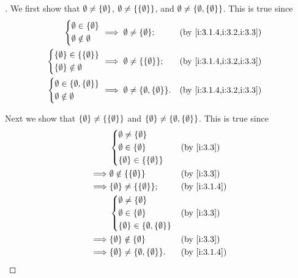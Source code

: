 \begin{proof}[]
  We first show that \(\emptyset \neq \left\lbrace\emptyset\right\rbrace\), \(\emptyset \neq \left\lbrace\left\lbrace\emptyset\right\rbrace\right\rbrace\), and \(\emptyset \neq \left\lbrace\emptyset, \left\lbrace\emptyset\right\rbrace\right\rbrace\).
  This is true since
  \begin{align*}
    \begin{dcases}
      \emptyset \in \set{\emptyset} \\
      \emptyset \notin \emptyset
    \end{dcases}                          & \implies \emptyset \neq \set{\emptyset};                  &  & \by{i:3.1.4,i:3.2,i:3.3} \\
    \begin{dcases}
      \set{\emptyset} \in \set{\set{\emptyset}} \\
      \set{\emptyset} \notin \emptyset
    \end{dcases}      & \implies \emptyset \neq \set{\set{\emptyset}};            &  & \by{i:3.1.4,i:3.2,i:3.3}                     \\
    \begin{dcases}
      \emptyset \in \set{\emptyset, \set{\emptyset}} \\
      \emptyset \notin \emptyset
    \end{dcases} & \implies \emptyset \neq \set{\emptyset, \set{\emptyset}}. &  & \by{i:3.1.4,i:3.2,i:3.3}
  \end{align*}

  Next we show that \(\left\lbrace\emptyset\right\rbrace \neq \left\lbrace\left\lbrace\emptyset\right\rbrace\right\rbrace\) and \(\left\lbrace\emptyset\right\rbrace \neq \left\lbrace\emptyset, \left\lbrace\emptyset\right\rbrace\right\rbrace\).
  This is true since
  \begin{align*}
             & \begin{dcases}
                 \emptyset \neq \set{\emptyset} \\
                 \emptyset \in \set{\emptyset}  \\
                 \set{\emptyset} \in \set{\set{\emptyset}}
               \end{dcases}            &  & \by{i:3.3}                               \\
    \implies & \emptyset \notin \set{\set{\emptyset}}                       &  & \by{i:3.3}   \\
    \implies & \set{\emptyset} \neq \set{\set{\emptyset}};                  &  & \by{i:3.1.4} \\
             & \begin{dcases}
                 \emptyset \neq \set{\emptyset} \\
                 \emptyset \in \set{\emptyset}  \\
                 \set{\emptyset} \in \set{\emptyset, \set{\emptyset}}
               \end{dcases} &  & \by{i:3.3}                    \\
    \implies & \set{\emptyset} \notin \set{\emptyset}                       &  & \by{i:3.3}   \\
    \implies & \set{\emptyset} \neq \set{\emptyset, \set{\emptyset}}.       &  & \by{i:3.1.4}
  \end{align*}


\end{proof}
